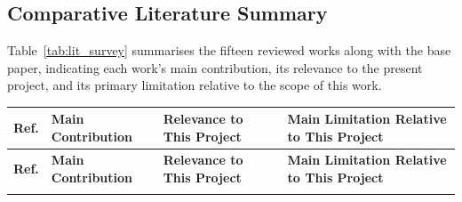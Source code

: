 \vspace{0.5cm}

\subsection{Comparative Literature Summary}

Table~\ref{tab:lit_survey} summarises the fifteen reviewed works along with the base paper, indicating each work's main contribution, its relevance to the present project, and its primary limitation relative to the scope of this work.

\begin{longtable}{|p{0.6cm}|p{3.8cm}|p{4.0cm}|p{4.5cm}|}
\hline
\textbf{Ref.} & \textbf{Main Contribution} & \textbf{Relevance to This Project} & \textbf{Main Limitation Relative to This Project} \\
\hline
\endfirsthead
\hline
\textbf{Ref.} & \textbf{Main Contribution} & \textbf{Relevance to This Project} & \textbf{Main Limitation Relative to This Project} \\
\hline
\endhead
\hline
\endfoot


\end{longtable}
